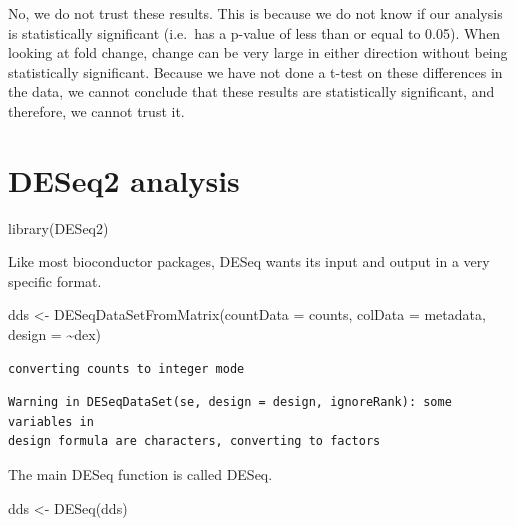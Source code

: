 \documentclass[
  letterpaper,
  DIV=11,
  numbers=noendperiod]{scrartcl}
\newenvironment{Shaded}{\begin{snugshade}}{\end{snugshade}}
\newcommand{\AttributeTok}[1]{\textcolor[rgb]{0.40,0.45,0.13}{#1}}
\newcommand{\FunctionTok}[1]{\textcolor[rgb]{0.28,0.35,0.67}{#1}}
\newcommand{\NormalTok}[1]{\textcolor[rgb]{0.00,0.23,0.31}{#1}}
\newcommand{\OtherTok}[1]{\textcolor[rgb]{0.00,0.23,0.31}{#1}}
\newcommand{\SpecialCharTok}[1]{\textcolor[rgb]{0.37,0.37,0.37}{#1}}
\begin{document}
No, we do not trust these results. This is because we do not know if our
analysis is statistically significant (i.e.~has a p-value of less than
or equal to 0.05). When looking at fold change, change can be very large
in either direction without being statistically significant. Because we
have not done a t-test on these differences in the data, we cannot
conclude that these results are statistically significant, and
therefore, we cannot trust it.

\hypertarget{deseq2-analysis}{%
\section{DESeq2 analysis}\label{deseq2-analysis}}

\begin{Shaded}
\begin{Highlighting}[]
\FunctionTok{library}\NormalTok{(DESeq2)}
\end{Highlighting}
\end{Shaded}

Like most bioconductor packages, DESeq wants its input and output in a
very specific format.

\begin{Shaded}
\begin{Highlighting}[]
\NormalTok{dds }\OtherTok{\textless{}{-}} \FunctionTok{DESeqDataSetFromMatrix}\NormalTok{(}\AttributeTok{countData =}\NormalTok{ counts, }
                       \AttributeTok{colData =}\NormalTok{ metadata, }
                       \AttributeTok{design =} \SpecialCharTok{\textasciitilde{}}\NormalTok{dex)}
\end{Highlighting}
\end{Shaded}

\begin{verbatim}
converting counts to integer mode
\end{verbatim}

\begin{verbatim}
Warning in DESeqDataSet(se, design = design, ignoreRank): some variables in
design formula are characters, converting to factors
\end{verbatim}

The main DESeq function is called DESeq.

\begin{Shaded}
\begin{Highlighting}[]
\NormalTok{dds }\OtherTok{\textless{}{-}} \FunctionTok{DESeq}\NormalTok{(dds)}
\end{Highlighting}
\end{Shaded}
\end{document}
